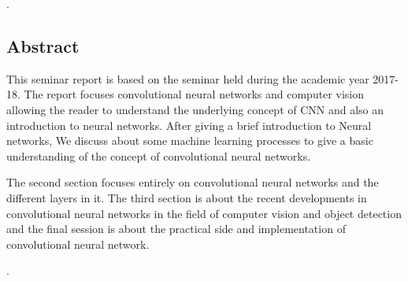 \documentclass[12pt]{article}
\begin{document}
\newpage
.
\vspace{50mm}
\begin{center}
\section*{\fontsize{16}{18}\selectfont Abstract}
\end{center}
\par This seminar report is based on the seminar held during the academic year 2017-18. The report focuses convolutional neural networks and computer vision allowing the reader to understand the underlying concept of CNN and also an introduction to neural networks. After giving a brief introduction to Neural networks, We discuss about some machine learning processes to give a basic understanding of the concept of convolutional neural networks. 
\vspace{5mm}
\par The second section focuses entirely on convolutional neural networks and the different layers in it. The third section is about the recent developments in convolutional neural networks in the field of computer vision and object detection and the final session is about the practical side and implementation of convolutional neural network.

\newpage
{}
\tableofcontents
\newpage
{}

\listoffigures
\listoftables
\newpage

.
\vspace{15mm} 
\end{document}

